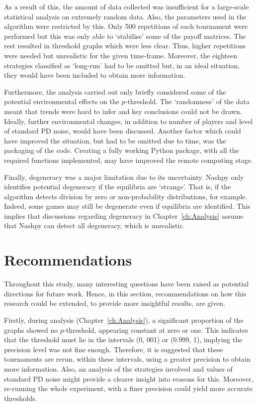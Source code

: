 As a result of this, the amount of data collected was insufficient for a
large-scale statistical analysis on extremely random data. Also, the
parameters used in the algorithm were restricted by this. Only 500
repetitions of each tournament were performed but this was only able to
`stabilise' some of the payoff matrices. The rest resulted in
threshold graphs which were less clear. Thus, higher repetitions were needed but
unrealistic for the given time-frame. Moreover, the eighteen strategies
classified as `long-run' had to be omitted but, in an ideal situation, they
would have been included to obtain more information.

Furthermore, the analysis carried out only briefly considered some of
the potential environmental effects on the \(p\)-threshold. The
`randomness' of the data meant that trends were hard to infer and key
conclusions could not be drawn. Ideally, further environmental
changes, in addition to number of players and level of standard PD noise, would
have been discussed. Another factor which could have improved the situation, but
had to be omitted due to time, was the packaging of the code. Creating a fully
working Python package, with all the required functions implemented, may have
improved the remote computing stage.

Finally, degeneracy was a major limitation due to its uncertainty. Nashpy only
identifies potential degeneracy if the equilibria are `strange'. That is, if the algorithm
detects division by zero or non-probability distributions, for example. Indeed, some
games may still be degenerate even if equilibria are identified.
This implies that discussions regarding degeneracy in
Chapter~\ref{ch:Analysis} assume that Nashpy can
detect all degeneracy, which is unrealistic.

\section{Recommendations}\label{sec:Recommendations}
Throughout this study, many interesting questions have been raised as potential
directions for future work. Hence, in this section, recommendations on how this
research could be extended, to provide more insightful results, are given.

Firstly, during analysis (Chapter~\ref{ch:Analysis}), a significant proportion
of the graphs showed no \(p\)-threshold, appearing constant at zero or one.
This indicates that the threshold must lie in the intervals (0, 001) or (0.999,
1), implying the precision level was not fine enough. Therefore, it is suggested
that these tournaments are rerun, within these intervals, using a greater
precision to obtain more information. Also, an analysis of the
strategies involved and values of standard PD noise might provide a
clearer insight into reasons for this. Moreover, re-running the whole
experiment, with a finer precision could yield
more accurate thresholds.

